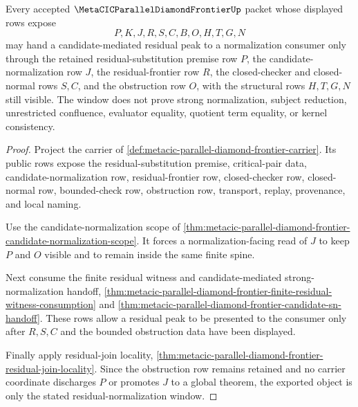 \begin{theorem}
\label{thm:metacic-parallel-diamond-frontier-residual-normalization-window}
Every accepted $\MetaCICParallelDiamondFrontierUp$ packet whose displayed rows expose
$$
P,K,J,R,S,C,B,O,H,T,G,N
$$
may hand a candidate-mediated residual peak to a normalization consumer only through the retained residual-substitution premise row $P$, the candidate-normalization row $J$, the residual-frontier row $R$, the closed-checker and closed-normal rows $S,C$, and the obstruction row $O$, with the structural rows $H,T,G,N$ still visible. The window does not prove strong normalization, subject reduction, unrestricted confluence, evaluator equality, quotient term equality, or kernel consistency.
\end{theorem}
\begin{proof}
Project the carrier of \autoref{def:metacic-parallel-diamond-frontier-carrier}. Its public rows expose the residual-substitution premise, critical-pair data, candidate-normalization row, residual-frontier row, closed-checker row, closed-normal row, bounded-check row, obstruction row, transport, replay, provenance, and local naming.

Use the candidate-normalization scope of \autoref{thm:metacic-parallel-diamond-frontier-candidate-normalization-scope}. It forces a normalization-facing read of $J$ to keep $P$ and $O$ visible and to remain inside the same finite spine.

Next consume the finite residual witness and candidate-mediated strong-normalization handoff, \autoref{thm:metacic-parallel-diamond-frontier-finite-residual-witness-consumption} and \autoref{thm:metacic-parallel-diamond-frontier-candidate-sn-handoff}. These rows allow a residual peak to be presented to the consumer only after $R,S,C$ and the bounded obstruction data have been displayed.

Finally apply residual-join locality, \autoref{thm:metacic-parallel-diamond-frontier-residual-join-locality}. Since the obstruction row remains retained and no carrier coordinate discharges $P$ or promotes $J$ to a global theorem, the exported object is only the stated residual-normalization window.
\end{proof}


